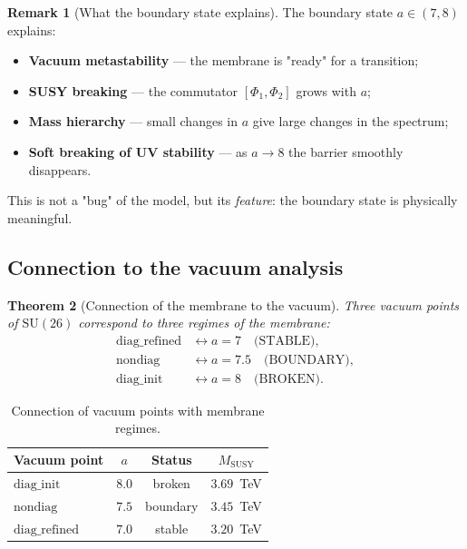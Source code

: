 \documentclass[11pt,a4paper]{article}
\newcommand{\SU}{\ensuremath{\mathrm{SU}}}
\newtheorem{theorem}{Theorem}[section]
\theoremstyle{definition}
\newtheorem{remark}[theorem]{Remark}
\begin{document}
\begin{remark}[What the boundary state explains]
\label{rem:membrane-boundary-explains}
The boundary state $a \in (7, 8)$ explains:
\begin{itemize}
    \item \textbf{Vacuum metastability} --- the membrane
          is "ready" for a transition;
    \item \textbf{SUSY breaking} --- the commutator $[\Phi_1, \Phi_2]$
          grows with $a$;
    \item \textbf{Mass hierarchy} --- small changes in $a$ give
          large changes in the spectrum;
    \item \textbf{Soft breaking of UV stability} --- as $a \to 8$
          the barrier smoothly disappears.
\end{itemize}
This is not a "bug" of the model, but its \emph{feature}: the boundary state
is physically meaningful.
\end{remark}

\subsection{Connection to the vacuum analysis}
\label{subsec:membrane-vacuum-link}

\begin{theorem}[Connection of the membrane to the vacuum]
\label{thm:membrane-vacuum}
Three vacuum points of $\SU(26)$ correspond to
three regimes of the membrane:
\begin{equation}
    \boxed{
    \begin{aligned}
        \text{diag\_refined} &\leftrightarrow a = 7 \quad \text{(STABLE)}, \\
        \text{nondiag}       &\leftrightarrow a = 7.5 \quad \text{(BOUNDARY)}, \\
        \text{diag\_init}    &\leftrightarrow a = 8 \quad \text{(BROKEN)}.
    \end{aligned}}
    \label{eq:membrane-vacuum-link}
\end{equation}
\end{theorem}

\begin{table}[ht]
\centering
\caption{Connection of vacuum points with membrane regimes.}
\label{tab:membrane-vacuum-table}
\begin{tabular}{lccc}
\toprule
Vacuum point & $a$ & Status & $M_{\text{SUSY}}$ \\
\midrule
$\text{diag\_init}$    & $8.0$ & broken   & $3.69$~TeV \\
$\text{nondiag}$       & $7.5$ & boundary & $3.45$~TeV \\
$\text{diag\_refined}$ & $7.0$ & stable   & $3.20$~TeV \\
\bottomrule
\end{tabular}
\end{table}
\end{document}
